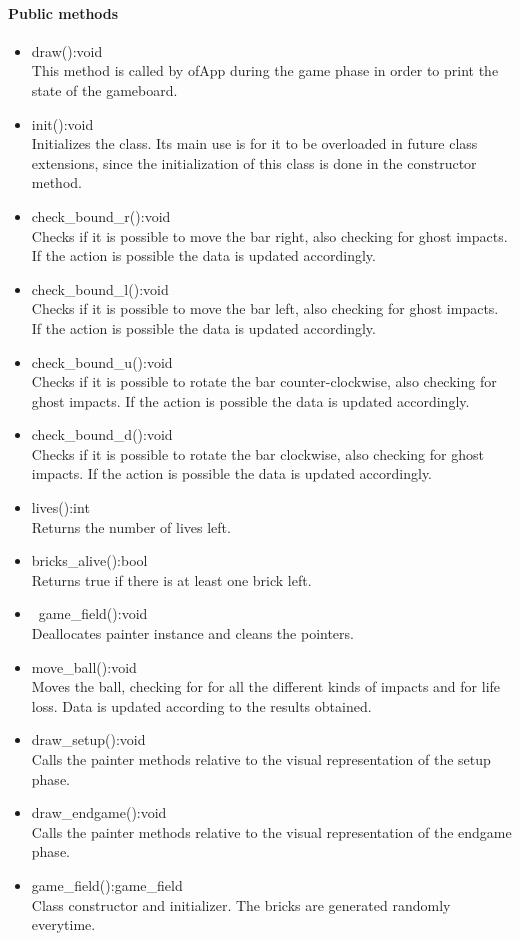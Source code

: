 \documentclass[]{article}
\begin{document}
	\paragraph{Public methods}
	\begin{itemize}
		\item draw():void \\This method is called by ofApp during the game phase in order to print the state of the gameboard. 
		\item init():void \\Initializes the class. Its main use is for it to be overloaded in future class extensions, since the initialization of this class is done in the constructor method.
		\item check\_bound\_r():void\\Checks if it is possible to move the bar right, also checking for ghost impacts. If the action is possible the data is updated accordingly.
		\item check\_bound\_l():void\\Checks if it is possible to move the bar left, also checking for ghost impacts. If the action is possible the data is updated accordingly.
		\item check\_bound\_u():void\\Checks if it is possible to rotate the bar counter-clockwise, also checking for ghost impacts. If the action is possible the data is updated accordingly.
		\item check\_bound\_d():void\\Checks if it is possible to rotate the bar clockwise, also checking for ghost impacts. If the action is possible the data is updated accordingly.
		\item lives():int\\Returns the number of lives left.
		\item bricks\_alive():bool\\Returns true if there is at least one brick left.
		\item ~game\_field():void\\Deallocates painter instance and cleans the pointers.
		\item move\_ball():void\\Moves the ball, checking for for all the different kinds of impacts and for life loss. Data is updated according to the results obtained.
		\item draw\_setup():void\\Calls the painter methods relative to the visual representation of the setup phase.
		\item draw\_endgame():void\\Calls the painter methods relative to the visual representation of the endgame phase.
		\item game\_field():game\_field\\Class constructor and initializer. The bricks are generated randomly everytime.
	\end{itemize}
\newpage
\end{document}

